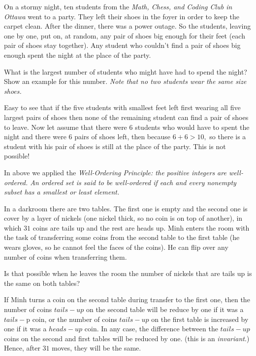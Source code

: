\documentclass{article}
\begin{document}
\begin{example*}

    On a stormy night, ten students from the \textit{Math, Chess, and Coding Club in Ottawa} went to a party.
    They left their shoes in the foyer in order to keep the carpet clean. After the dinner, there was a power outage.
    So the students, leaving one by one, put on, at random, any pair of shoes big enough for their feet (each pair of shoes stay together).
    Any student who couldn't find a pair of shoes big enough spent the night at the place of the party.
	
    What is the largest number of students who might have had to spend the night? Show an example for this number.
    \textit{Note that no two students wear the same size shoes.}
\end{example*}

\begin{soln}
    Easy to see that if the five students with smallest feet left first wearing all five largest pairs of shoes
    then none of the remaining student can find a pair of shoes to leave.
	Now let assume that there were 6 students who would have to spent the night and there were 6 pairs of shoes left,
    then because $6 + 6 > 10,$ so there is a student with his pair of shoes is still at the place of the party. This is not possible!

    In above we applied the \textit{Well-Ordering Principle: the positive integers are well-ordered.
    An ordered set is said to be well-ordered if each and every nonempty subset has a smallest or least element.} 
\end{soln}

\begin{example*}

    In a darkroom there are two tables. The first one is empty and the second one is cover by a layer of nickels
    (one nickel thick, so no coin is on top of another), in which $31$ coins are tails up and the rest are heads up.
    Minh enters the room with the task of transferring some coins from the second table to the first table
    (he wears gloves, so he cannot feel the faces of the coins). He can flip over any number of coins when transferring them.

    Is that possible when he leaves the room the number of nickels that are tails up is the same on both tables?
\end{example*}

\begin{soln}
    If Minh turns a coin on the second table during transfer to the first one,
    then the number of coins $tails-up$ on the second table will be reduce by one if it was a $tails-$p coin,
    or the number of coins $tails-up$ on the first table is increased by one if it was a $heads-up$ coin.
    In any case, the difference between the $tails-up$ coins on the second and first tables will be reduced by one.
    (this is an \textit{invariant}.) Hence, after $31$ moves, they will be the same.
\end{soln}
\end{document}
